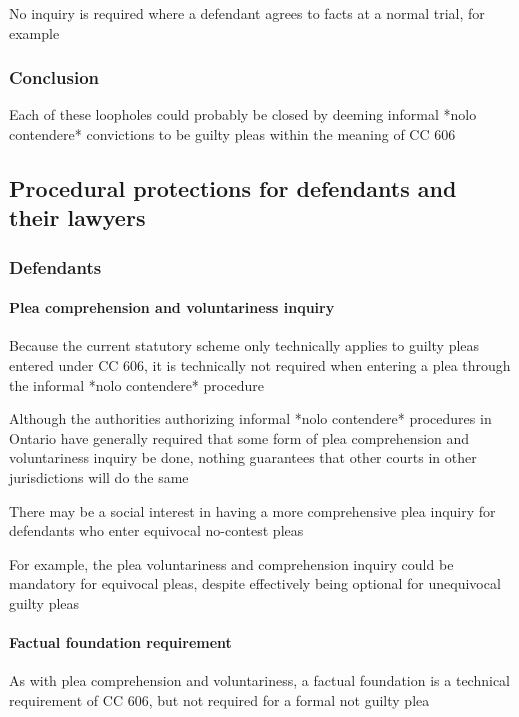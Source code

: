 No inquiry is required where a defendant agrees to facts at a normal trial, for example

\subsubsection{Conclusion}

Each of these loopholes could probably be closed by deeming informal *nolo contendere* convictions to be guilty pleas within the meaning of CC 606

\subsection{Procedural protections for defendants and their lawyers}

\subsubsection{Defendants}
\paragraph{Plea comprehension and voluntariness inquiry\\}

Because the current statutory scheme only technically applies to guilty pleas entered under CC 606, it is technically not required when entering a plea through the informal *nolo contendere* procedure

Although the authorities authorizing informal *nolo contendere* procedures in Ontario have generally required that some form of plea comprehension and voluntariness inquiry be done, nothing guarantees that other courts in other jurisdictions will do the same

There may be a social interest in having a more comprehensive plea inquiry for defendants who enter equivocal no-contest pleas

For example, the plea voluntariness and comprehension inquiry could be mandatory for equivocal pleas, despite effectively being optional for unequivocal guilty pleas

\paragraph{Factual foundation requirement\\}

As with plea comprehension and voluntariness, a factual foundation is a technical requirement of CC 606, but not required for a formal not guilty plea

